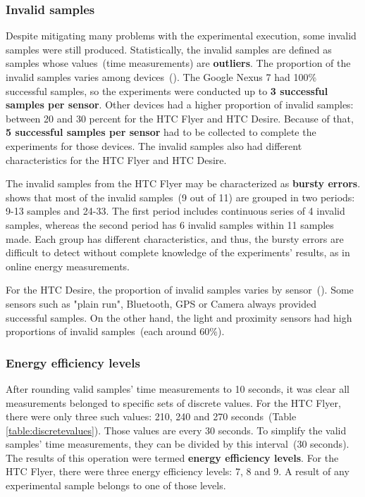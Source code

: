 \subsubsection{Invalid samples}
\hspace{10pt} Despite mitigating many problems with the experimental execution, some invalid samples were still produced. Statistically, the invalid samples are defined as samples whose values\ (time measurements) are \textbf{outliers}. The proportion of the invalid samples varies among devices\ (). The Google Nexus 7 had 100\% successful samples, so the experiments were conducted up to \textbf{3 successful samples per sensor}. Other devices had a higher proportion of invalid samples: between 20 and 30 percent for the HTC Flyer and HTC Desire. Because of that, \textbf{5 successful samples per sensor} had to be collected to complete the experiments for those devices. The invalid samples also had different characteristics for the HTC Flyer and HTC Desire. 

	
The invalid samples from the HTC Flyer may be characterized as \textbf{bursty errors}.  shows that most of the invalid samples\ (9 out of 11) are grouped in two periods: 9-13 samples and 24-33. The first period includes continuous series of 4 invalid samples, whereas the second period has 6 invalid samples within 11 samples made. Each group has different characteristics, and thus, the bursty errors are difficult to detect without complete knowledge of the experiments' results, as in online energy measurements.


For the HTC Desire, the proportion of invalid samples varies by sensor\ (). Some sensors such as "plain run", Bluetooth, GPS or Camera always provided successful samples. On the other hand, the light and proximity sensors had high proportions of invalid samples\ (each around 60\%). 



\subsubsection{Energy efficiency levels}
\hspace{10pt} After rounding valid samples' time measurements to 10 seconds, it was clear all measurements belonged to specific sets of discrete values. For the HTC Flyer, there were only three such values: 210, 240 and 270 seconds\ (Table \ref{table:discretevalues}). Those values are every 30 seconds. To simplify the valid samples' time measurements, they can be divided by this interval\ (30 seconds). The results of this operation were termed \textbf{energy efficiency levels}. For the HTC Flyer, there were three energy efficiency levels: 7, 8 and 9. A result of any experimental sample belongs to one of those levels. 
			
